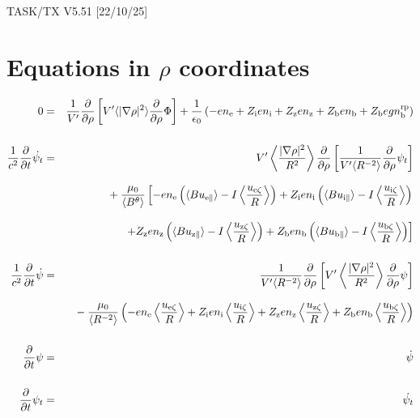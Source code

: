 \documentclass[11pt]{article}
\def\r#1{{\rm#1}}
\def\ave#1{\left\langle#1\right\rangle}
\def\aves#1{\langle#1\rangle}
\def\para{\parallel}
\def\ddrho{\frac{\partial}{\partial\rho}}
\def\ddt{\frac{\partial}{\partial t}}
\def\gradrho2{\aves{|\nabla\rho|^2}}
\def\psid{\dot{\psi}}
\def\psit{\psi_t}
\def\psitd{\dot{\psit}}
\def\nee{n_\r{e}}
\def\ni{n_\r{i}}
\def\nz{n_\r{z}}
\def\nb{n_\r{b}}
\def\Zi{Z_\r{i}}
\def\Zz{Z_\r{z}}
\def\Zb{Z_\r{b}}
\def\uzt#1{u_{\r{#1}\zeta}}
\def\upara#1{u_{\r{#1}\para}}
\def\nbrp{n_\r{b}^\r{rp}}
\begin{document}
\begin{center}
TASK/TX V5.51 [22/10/25]
\end{center}

\section{Equations in $\rho$ coordinates}
\vspace{-5mm}

%
\begin{eqnarray}
  0 &=&
%
    \frac{1}{V'} \ddrho \left[ V' \gradrho2 \ddrho{\Phi} \right]
%
  + \frac{1}{\epsilon_0}
%
    \left(-e \nee + \Zi e \ni + \Zz e \nz + \Zb e \nb + \Zb e g \nbrp \right)
\\[5mm]
  \frac{1}{c^2} \ddt \psitd &=&
%
    V' \ave{\frac{|\nabla\rho|^2}{R^2}} \ddrho \left[ \frac{1}{V'\aves{R^{-2}}}
				         \ddrho \psit \right] \nonumber\\[3mm]&&{}
%
  + \frac{\mu_0}{\aves{B^\theta}}
%
    \left[-     e \nee \left( \aves{B\upara{e}} - I\ave{\frac{\uzt{e}}{R}} \right)
          + \Zi e \ni  \left( \aves{B\upara{i}} - I\ave{\frac{\uzt{i}}{R}} \right)
    \right.\nonumber\\[3mm]&&{}
    \left.+ \Zz e \nz  \left( \aves{B\upara{z}} - I\ave{\frac{\uzt{z}}{R}} \right)
          + \Zb e \nb  \left( \aves{B\upara{b}} - I\ave{\frac{\uzt{b}}{R}} \right) \right]
\\[5mm]
  \frac{1}{c^2} \ddt \psid &=&
%
  \frac{1}{V'\aves{R^{-2}}} \ddrho \left[ V'
				    \ave{\frac{|\nabla\rho|^2}{R^2}}
				    \ddrho \psi \right] \nonumber\\[3mm]&&{}
%
  - \frac{\mu_0}{\aves{R^{-2}}} \left(-e \nee \ave{\frac{\uzt{e}}{R}}
			         + \Zi e \ni  \ave{\frac{\uzt{i}}{R}}
			         + \Zz e \nz  \ave{\frac{\uzt{z}}{R}}
			         + \Zb e \nb  \ave{\frac{\uzt{b}}{R}} \right)
%
\\[5mm]
  \ddt \psi &=&
%
  \psid
\\[5mm]
  \ddt \psit &=&
%
  \psitd
\end{eqnarray}
%

\end{document}
